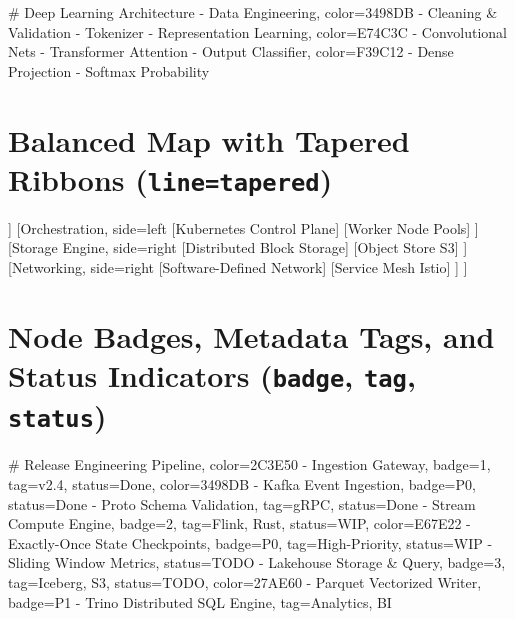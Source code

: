 \documentclass{article}
\begin{document}
\begin{mindchart}[theme=rainbow, layout=right, style=classic, line=tapered]
# Deep Learning Architecture
  - Data Engineering, color=3498DB
    - Cleaning \& Validation
    - Tokenizer
  - Representation Learning, color=E74C3C
    - Convolutional Nets
    - Transformer Attention
  - Output Classifier, color=F39C12
    - Dense Projection
    - Softmax Probability
\end{mindchart}

\vspace{1.5cm}

\section*{Balanced Map with Tapered Ribbons (\texttt{line=tapered})}

\begin{mindchart}[theme=business, layout=balanced, style=classic, line=tapered, scale=0.70]
[Cloud Operating System
  [Virtualization, side=left
    [Type-1 Hypervisor]
    [Hardware Isolation]
  ]
  [Orchestration, side=left
    [Kubernetes Control Plane]
    [Worker Node Pools]
  ]
  [Storage Engine, side=right
    [Distributed Block Storage]
    [Object Store S3]
  ]
  [Networking, side=right
    [Software-Defined Network]
    [Service Mesh Istio]
  ]
]
\end{mindchart}

\newpage

\section*{Node Badges, Metadata Tags, and Status Indicators (\texttt{badge}, \texttt{tag}, \texttt{status})}

\begin{mindchart}[theme=rainbow, layout=right, style=classic, line=tapered, scale=0.60]
# Release Engineering Pipeline, color=2C3E50
  - Ingestion Gateway, badge=1, tag=v2.4, status=Done, color=3498DB
    - Kafka Event Ingestion, badge=P0, status=Done
    - Proto Schema Validation, tag=gRPC, status=Done
  - Stream Compute Engine, badge=2, tag={Flink, Rust}, status=WIP, color=E67E22
    - Exactly-Once State Checkpoints, badge=P0, tag=High-Priority, status=WIP
    - Sliding Window Metrics, status=TODO
  - Lakehouse Storage \& Query, badge=3, tag={Iceberg, S3}, status=TODO, color=27AE60
    - Parquet Vectorized Writer, badge=P1
    - Trino Distributed SQL Engine, tag={Analytics, BI}
\end{mindchart}
\end{document}
